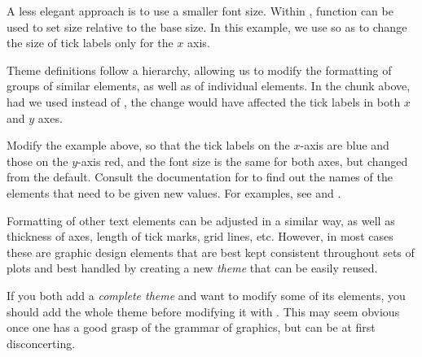 \documentclass[krantz2]{krantz}\usepackage{knitr}
\begin{document}
A less elegant approach is to use a smaller font size. Within , function  can be used to set size relative to the base size. In this example, we use  so as to change the size of tick labels only for the $x$ axis.

\begin{knitrout}\footnotesize
{}\color{fgcolor}\begin{kframe}
\begin{alltt}
  \hlstd{(} \hlstd{=} \hlstd{(} \hlstd{=} \hlstd{(}\hlstd{)))}
\end{alltt}
\end{kframe}
\end{knitrout}

Theme definitions follow a hierarchy, allowing us to modify the formatting of groups of similar elements, as well as of individual elements. In the chunk above, had we used  instead of , the change would have affected the tick labels in both $x$ and $y$ axes.

\begin{playground}
Modify the example above, so that the tick labels on the $x$-axis are blue and those on the $y$-axis red, and the font size is the same for both axes, but changed from the default. Consult the documentation for  to find out the names of the elements that need to be given new values. For examples, see  \autocite{Wickham2016} and  \autocite{Chang2018}.
\end{playground}

Formatting of other text elements can be adjusted in a similar way, as well as thickness of axes, length of tick marks, grid lines, etc. However, in most cases these are graphic design elements that are best kept consistent throughout sets of plots and best handled by creating a new \emph{theme} that can be easily reused.

\begin{warningbox}
If you both add a \emph{complete theme} and want to modify some of its elements, you should add the whole theme before modifying it with . This may seem obvious once one has a good grasp of the grammar of graphics, but can be at first disconcerting.
\end{warningbox}
\end{document}
